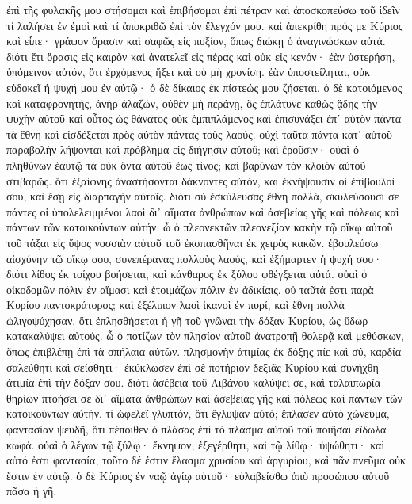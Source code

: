 
ἐπὶ
τῆς
φυλακῆς
μου
στήσομαι
καὶ
ἐπιβήσομαι
ἐπὶ
πέτραν
καὶ
ἀποσκοπεύσω
τοῦ
ἰδεῖν
τί
λαλήσει
ἐν
ἐμοὶ
καὶ
τί
ἀποκριθῶ
ἐπὶ
τὸν
ἔλεγχόν
μου.
καὶ
ἀπεκρίθη
πρός
με
Κύριος
καὶ
εἶπε·
γράψον
ὅρασιν
καὶ
σαφῶς
εἰς
πυξίον,
ὅπως
διώκῃ
ὁ
ἀναγινώσκων
αὐτά.
διότι
ἔτι
ὅρασις
εἰς
καιρὸν
καὶ
ἀνατελεῖ
εἰς
πέρας
καὶ
οὐκ
εἰς
κενόν·
ἐὰν
ὑστερήσῃ,
ὑπόμεινον
αὐτόν,
ὅτι
ἐρχόμενος
ἥξει
καὶ
οὐ
μὴ
χρονίσῃ.
ἐὰν
ὑποστείληται,
οὐκ
εὐδοκεῖ
ἡ
ψυχή
μου
ἐν
αὐτῷ·
ὁ
δὲ
δίκαιος
ἐκ
πίστεώς
μου
ζήσεται.
ὁ
δὲ
κατοιόμενος
καὶ
καταφρονητής,
ἀνὴρ
ἀλαζών,
οὐθὲν
μὴ
περάνῃ,
ὃς
ἐπλάτυνε
καθὼς
ᾅδης
τὴν
ψυχὴν
αὐτοῦ
καὶ
οὗτος
ὡς
θάνατος
οὐκ
ἐμπιπλάμενος
καὶ
ἐπισυνάξει
ἐπ᾿
αὐτὸν
πάντα
τὰ
ἔθνη
καὶ
εἰσδέξεται
πρὸς
αὐτὸν
πάντας
τοὺς
λαούς.
οὐχὶ
ταῦτα
πάντα
κατ᾿
αὐτοῦ
παραβολὴν
λήψονται
καὶ
πρόβλημα
εἰς
διήγησιν
αὐτοῦ;
καὶ
ἐροῦσιν·
οὐαὶ
ὁ
πληθύνων
ἑαυτῷ
τὰ
οὐκ
ὄντα
αὐτοῦ
ἕως
τίνος;
καὶ
βαρύνων
τὸν
κλοιὸν
αὐτοῦ
στιβαρῶς.
ὅτι
ἐξαίφνης
ἀναστήσονται
δάκνοντες
αὐτόν,
καὶ
ἐκνήψουσιν
οἱ
ἐπίβουλοί
σου,
καὶ
ἔσῃ
εἰς
διαρπαγὴν
αὐτοῖς.
διότι
σὺ
ἐσκύλευσας
ἔθνη
πολλά,
σκυλεύσουσί
σε
πάντες
οἱ
ὑπολελειμμένοι
λαοὶ
δι᾿
αἵματα
ἀνθρώπων
καὶ
ἀσεβείας
γῆς
καὶ
πόλεως
καὶ
πάντων
τῶν
κατοικούντων
αὐτήν.
ὦ
ὁ
πλεονεκτῶν
πλεονεξίαν
κακὴν
τῷ
οἴκῳ
αὐτοῦ
τοῦ
τάξαι
εἰς
ὕψος
νοσσιὰν
αὐτοῦ
τοῦ
ἐκσπασθῆναι
ἐκ
χειρὸς
κακῶν.
ἐβουλεύσω
αἰσχύνην
τῷ
οἴκῳ
σου,
συνεπέρανας
πολλοὺς
λαούς,
καὶ
ἐξήμαρτεν
ἡ
ψυχή
σου·
διότι
λίθος
ἐκ
τοίχου
βοήσεται,
καὶ
κάνθαρος
ἐκ
ξύλου
φθέγξεται
αὐτά.
οὐαὶ
ὁ
οἰκοδομῶν
πόλιν
ἐν
αἵμασι
καὶ
ἑτοιμάζων
πόλιν
ἐν
ἀδικίαις.
οὐ
ταῦτά
ἐστι
παρὰ
Κυρίου
παντοκράτορος;
καὶ
ἐξέλιπον
λαοὶ
ἱκανοὶ
ἐν
πυρί,
καὶ
ἔθνη
πολλὰ
ὠλιγοψύχησαν.
ὅτι
ἐπλησθήσεται
ἡ
γῆ
τοῦ
γνῶναι
τὴν
δόξαν
Κυρίου,
ὡς
ὕδωρ
κατακαλύψει
αὐτούς.
ὦ
ὁ
ποτίζων
τὸν
πλησίον
αὐτοῦ
ἀνατροπῇ
θολερᾷ
καὶ
μεθύσκων,
ὅπως
ἐπιβλέπῃ
ἐπὶ
τὰ
σπήλαια
αὐτῶν.
πλησμονὴν
ἀτιμίας
ἐκ
δόξης
πίε
καὶ
σύ,
καρδία
σαλεύθητι
καὶ
σείσθητι·
ἐκύκλωσεν
ἐπὶ
σὲ
ποτήριον
δεξιᾶς
Κυρίου
καὶ
συνήχθη
ἀτιμία
ἐπὶ
τὴν
δόξαν
σου.
διότι
ἀσέβεια
τοῦ
Λιβάνου
καλύψει
σε,
καὶ
ταλαιπωρία
θηρίων
πτοήσει
σε
δι᾿
αἵματα
ἀνθρώπων
καὶ
ἀσεβείας
γῆς
καὶ
πόλεως
καὶ
πάντων
τῶν
κατοικούντων
αὐτήν.
τί
ὠφελεῖ
γλυπτόν,
ὅτι
ἔγλυψαν
αὐτό;
ἔπλασεν
αὐτὸ
χώνευμα,
φαντασίαν
ψευδῆ,
ὅτι
πέποιθεν
ὁ
πλάσας
ἐπὶ
τὸ
πλάσμα
αὐτοῦ
τοῦ
ποιῆσαι
εἴδωλα
κωφά.
οὐαὶ
ὁ
λέγων
τῷ
ξύλῳ·
ἔκνηψον,
ἐξεγέρθητι,
καὶ
τῷ
λίθῳ·
ὑψώθητι·
καὶ
αὐτό
ἐστι
φαντασία,
τοῦτο
δέ
ἐστιν
ἔλασμα
χρυσίου
καὶ
ἀργυρίου,
καὶ
πᾶν
πνεῦμα
οὐκ
ἔστιν
ἐν
αὐτῷ.
ὁ
δὲ
Κύριος
ἐν
ναῷ
ἁγίῳ
αὐτοῦ·
εὐλαβείσθω
ἀπὸ
προσώπου
αὐτοῦ
πᾶσα
ἡ
γῆ.



